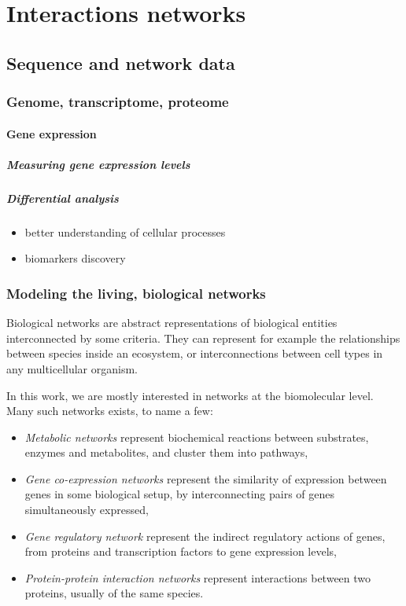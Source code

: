\chapter{Interactions networks}
\label{chap:prelim}

\section{Sequence and network data}

	\subsection{Genome, transcriptome, proteome}

		\subsubsection{Gene expression}

		\paragraph{Measuring gene expression levels}

		\paragraph{Differential analysis}

			\begin{itemize}
				\item better understanding of cellular processes
				\item biomarkers discovery
			\end{itemize}

	\subsection{Modeling the living, biological networks}
		Biological networks are abstract representations of biological entities interconnected by some criteria.
		They can represent for example the relationships between species inside an ecosystem, or interconnections between cell types in any multicellular organism.

		In this work, we are mostly interested in networks at the biomolecular level.
		Many such networks exists, to name a few:
		\begin{itemize}
			\item \emph{Metabolic networks} represent biochemical reactions between substrates, enzymes and metabolites, and cluster them into pathways,
			\item \emph{Gene co-expression networks} represent the similarity of expression between genes in some biological setup, by interconnecting pairs of genes simultaneously expressed,
			\item \emph{Gene regulatory network} represent the indirect regulatory actions of genes, from proteins and transcription factors to gene expression levels,
			\item \emph{Protein-protein interaction networks} represent interactions between two proteins, usually of the same species.
		\end{itemize}

